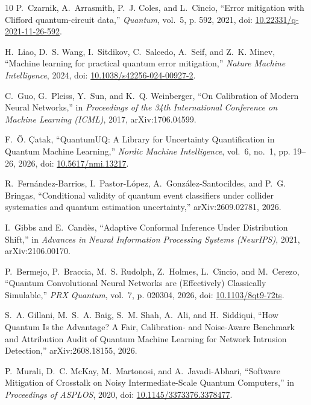 \documentclass[10pt,conference]{IEEEtran}
\begin{document}
\begin{thebibliography}{10}
P.~Czarnik, A.~Arrasmith, P.~J. Coles, and L.~Cincio, ``{Error mitigation with
  Clifford quantum-circuit data},'' \emph{Quantum}, vol.~5, p. 592, 2021, doi:
  \href{https://doi.org/10.22331/q-2021-11-26-592}{10.22331/q-2021-11-26-592}.

H.~Liao, D.~S. Wang, I.~Sitdikov, C.~Salcedo, A.~Seif, and Z.~K. Minev,
  ``{Machine learning for practical quantum error mitigation},'' \emph{Nature
  Machine Intelligence}, 2024, doi:
  \href{https://doi.org/10.1038/s42256-024-00927-2}{10.1038/s42256-024-00927-2}.

C.~Guo, G.~Pleiss, Y.~Sun, and K.~Q. Weinberger, ``{On Calibration of Modern
  Neural Networks},'' in \emph{Proceedings of the 34th International Conference
  on Machine Learning (ICML)}, 2017, arXiv:1706.04599.

F.~{\"O}. {\c{C}}atak, ``{QuantumUQ: A Library for Uncertainty Quantification
  in Quantum Machine Learning},'' \emph{Nordic Machine Intelligence}, vol.~6,
  no.~1, pp. 19--26, 2026, doi:
  \href{https://doi.org/10.5617/nmi.13217}{10.5617/nmi.13217}.

R.~Fernández-Barrios, I.~Pastor-López, A.~González-Santocildes, and P.~G.
  Bringas, ``{Conditional validity of quantum event classifiers under collider
  systematics and quantum estimation uncertainty},'' arXiv:2609.02781, 2026.

I.~Gibbs and E.~Cand{\`e}s, ``{Adaptive Conformal Inference Under Distribution
  Shift},'' in \emph{Advances in Neural Information Processing Systems
  (NeurIPS)}, 2021, arXiv:2106.00170.

P.~Bermejo, P.~Braccia, M.~S. Rudolph, Z.~Holmes, L.~Cincio, and M.~Cerezo,
  ``{Quantum Convolutional Neural Networks are (Effectively) Classically
  Simulable},'' \emph{PRX Quantum}, vol.~7, p. 020304, 2026, doi:
  \href{https://doi.org/10.1103/8qt9-72ts}{10.1103/8qt9-72ts}.

S.~A. Gillani, M.~S.~A. Baig, S.~M. Shah, A.~Ali, and H.~Siddiqui, ``{How
  Quantum Is the Advantage? A Fair, Calibration- and Noise-Aware Benchmark and
  Attribution Audit of Quantum Machine Learning for Network Intrusion
  Detection},'' arXiv:2608.18155, 2026.

P.~Murali, D.~C. McKay, M.~Martonosi, and A.~Javadi-Abhari, ``{Software
  Mitigation of Crosstalk on Noisy Intermediate-Scale Quantum Computers},'' in
  \emph{Proceedings of ASPLOS}, 2020, doi:
  \href{https://doi.org/10.1145/3373376.3378477}{10.1145/3373376.3378477}.


\end{thebibliography}
\end{document}

